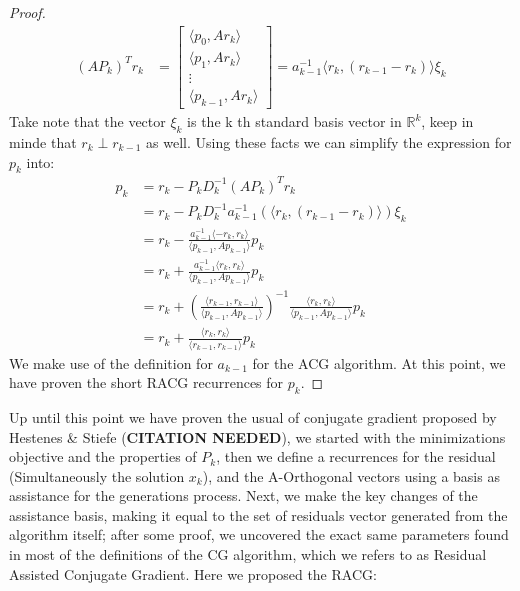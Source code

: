 \documentclass[]{article}
\theoremstyle{definition}
\begin{document}
\begin{proof}
                \begin{align}
                    (AP_k)^Tr_k &= 
                    \begin{bmatrix}
                        \langle p_0, Ar_k\rangle
                        \\
                        \langle p_1, Ar_k\rangle
                        \\
                        \vdots
                        \\
                        \langle p_{k - 1}, Ar_k\rangle
                    \end{bmatrix}
                    = 
                    a_{k - 1}^{-1}\langle r_k, (r_{k - 1} - r_{k})\rangle \xi_k
                \end{align}
                Take note that the vector $\xi_k$ is the k th standard basis vector in $\mathbb{R}^k$, keep in minde that $r_k\perp r_{k - 1}$ as well. Using these facts we can simplify the expression for $p_k$ into: 
                \begin{align}
                    p_k &= r_k - P_kD^{-1}_k(AP_k)^Tr_k
                    \\
                    &= r_k - P_kD_k^{-1}a_{k - 1}^{-1}(\langle r_k, (r_{k - 1} - r_{k})\rangle) \xi_k
                    \\
                    &= 
                    r_k - \frac{a_{k -1}^{-1}\langle -r_k, r_k\rangle}
                    {\langle p_{k - 1}, Ap_{k - 1}\rangle}p_k
                    \\
                    &= r_k + \frac{a_{k -1}^{-1}\langle r_k, r_k\rangle}
                    {\langle p_{k - 1}, Ap_{k - 1}\rangle}p_k
                    \\
                    &= r_k + 
                    \left(
                        \frac{\langle r_{k - 1}, r_{k - 1}\rangle}{\langle p_{k - 1}, Ap_{k - 1}\rangle}
                    \right)^{-1}
                    \frac{\langle r_k, r_k\rangle}{\langle p_{k - 1}, Ap_{k - 1}\rangle}p_k
                    \\
                    &= 
                    r_k + \frac{\langle r_k, r_k\rangle}{\langle r_{k - 1}, r_{k - 1}\rangle}p_k
                \end{align}
                We make use of the definition for $a_{k-1}$ for the ACG algorithm. At this point, we have proven the short RACG recurrences for $p_k$. 
            \end{proof}
            Up until this point we have proven the usual of conjugate gradient proposed by Hestenes \& Stiefe (\textbf{CITATION NEEDED}), we started with the minimizations objective and the properties of $P_k$, then we define a recurrences for the residual (Simultaneously the solution $x_k$), and the A-Orthogonal vectors using a basis as assistance for the generations process. Next, we make the key changes of the assistance basis, making it equal to the set of residuals vector generated from the algorithm itself; after some proof, we uncovered the exact same parameters found in most of the definitions of the CG algorithm, which we refers to as Residual Assisted Conjugate Gradient. Here we proposed the RACG: 
\end{document}
